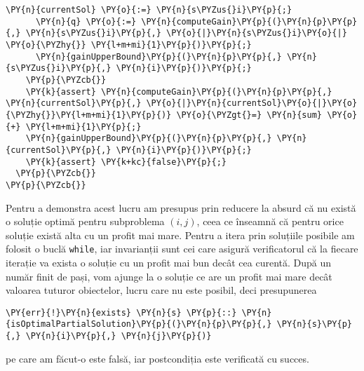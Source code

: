 \begin{sloppypar}
\begin{Verbatim}[commandchars=\\\{\}]
      \PY{n}{currentSol} \PY{o}{:=} \PY{n}{s\PYZus{}i}\PY{p}{;}
      \PY{n}{q} \PY{o}{:=} \PY{n}{computeGain}\PY{p}{(}\PY{n}{p}\PY{p}{,} \PY{n}{s\PYZus{}i}\PY{p}{,} \PY{o}{|}\PY{n}{s\PYZus{}i}\PY{o}{|} \PY{o}{\PYZhy{}} \PY{l+m+mi}{1}\PY{p}{)}\PY{p}{;}
      \PY{n}{gainUpperBound}\PY{p}{(}\PY{n}{p}\PY{p}{,} \PY{n}{s\PYZus{}i}\PY{p}{,} \PY{n}{i}\PY{p}{)}\PY{p}{;}
    \PY{p}{\PYZcb{}}
    \PY{k}{assert} \PY{n}{computeGain}\PY{p}{(}\PY{n}{p}\PY{p}{,} \PY{n}{currentSol}\PY{p}{,} \PY{o}{|}\PY{n}{currentSol}\PY{o}{|}\PY{o}{\PYZhy{}}\PY{l+m+mi}{1}\PY{p}{)} \PY{o}{\PYZgt{}=} \PY{n}{sum} \PY{o}{+} \PY{l+m+mi}{1}\PY{p}{;}
    \PY{n}{gainUpperBound}\PY{p}{(}\PY{n}{p}\PY{p}{,} \PY{n}{currentSol}\PY{p}{,} \PY{n}{i}\PY{p}{)}\PY{p}{;}
    \PY{k}{assert} \PY{k+kc}{false}\PY{p}{;}
  \PY{p}{\PYZcb{}}
\PY{p}{\PYZcb{}}
\end{Verbatim}
\hspace{4mm} Pentru a demonstra acest lucru am presupus prin reducere la absurd că nu există o soluție optimă pentru subproblema $(i, j)$, ceea ce  înseamnă că pentru orice soluție există alta cu un profit mai mare. Pentru a itera prin soluțiile posibile am folosit o buclă \texttt{while}, iar invarianții sunt cei care asigură verificatorul că la fiecare iterație va exista o soluție cu un profit mai bun decât cea curentă. După un număr finit de pași, vom ajunge la o soluție ce are un profit mai mare decât valoarea tuturor obiectelor, lucru care nu este posibil, deci presupunerea
\begin{Verbatim}[commandchars=\\\{\}]
\PY{err}{!}\PY{n}{exists} \PY{n}{s} \PY{p}{::} \PY{n}{isOptimalPartialSolution}\PY{p}{(}\PY{n}{p}\PY{p}{,} \PY{n}{s}\PY{p}{,} \PY{n}{i}\PY{p}{,} \PY{n}{j}\PY{p}{)}
\end{Verbatim}
pe care am făcut-o este falsă, iar postcondiția este verificată cu succes.

\end{sloppypar}